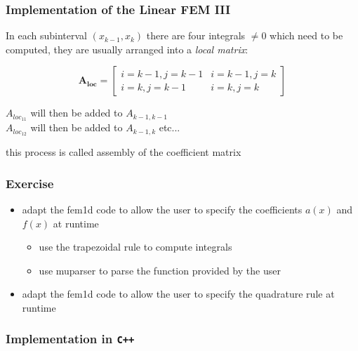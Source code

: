 \documentclass[smaller,a4paper]{beamer}
\newcommand{\Myfoilheadskip}[1]{\begin{frame}\frametitle{#1}}
\newcommand{\mtrx}[1]{\mathbf{#1}}
\begin{document}
\Myfoilheadskip{Implementation of the Linear FEM III}%

In each subinterval $(x_{k-1},x_{k})$ there are four integrals $\neq 0$ which 
need to be computed, they are usually arranged into a \emph{local matrix}:

$$
\mtrx{A_{loc}}=
\left[\begin{array}{cc}
i=k-1,j=k-1 & i=k-1,j=k \\[.1cm]
i=k,j=k-1 & i=k,j=k 
\end{array}\right]
$$

\null

\noindent 
$A_{loc_{11}}$ will then be added to $A_{k-1,k-1}$  \\
$A_{loc_{12}}$ will then be added to $A_{k-1,k}$ etc...

\null

this process is called assembly of the coefficient matrix

\end{frame}

\begin{frame}\frametitle{Exercise}
\begin{itemize}
\item adapt the fem1d code to allow the user to specify the coefficients $a(x)$ and $f(x)$ at runtime
\begin{itemize}
\item use the trapezoidal rule to compute integrals
\item use muparser to parse the function provided by the user
\end{itemize}
\item adapt the fem1d code to allow the user to specify the quadrature rule at runtime
\end{itemize}
\end{frame}

\begin{frame}[fragile]
\frametitle{Implementation in {\tt C++} }
\tiny
{}
\end{frame}
\end{document}
